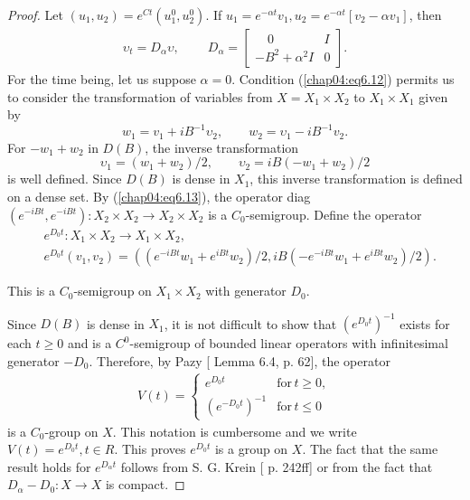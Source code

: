 \documentclass{surv-l}
\theoremstyle{plain}
\theoremstyle{definition}
\numberwithin{equation}{section}
\numberwithin{figure}{chapter}
\begin{document}
\begin{proof}
Let $(u_{1}, u_{2})=e^{Ct}(u_{1}^{0}, u_{2}^{0})$. If $u_{1}=e^{-\alpha t}v_{1}, u_{2}=e^{-\alpha t}[v_{2}-\alpha v_{1}]$, then
\begin{align}\label{chap04:eq6.14}
\upsilon_{t}=D_{\alpha}\upsilon,\ \qquad D_{\alpha}=\left[\begin{array}{cc}
\quad 0 & I\\
-B^{2}+\alpha^{2}I & 0
\end{array}\right].
\end{align}
For the time being, let us suppose $\alpha=0$. Condition (\ref{chap04:eq6.12}) permits us to consider the transformation of variables from $X=X_{1}\times X_{2}$ to $X_{1}\times X_{1}$ given by
\begin{equation*}
w_{1}=v_{1}+iB^{-1}\upsilon_{2},\qquad w_{2}=\upsilon_{1}-iB^{-1}v_{2}.
\end{equation*}
For $-w_{1}+w_{2}$ in $D(B)$, the inverse transformation
\begin{equation*}
\upsilon_{1}=(w_{1}+w_{2})/2,\qquad \upsilon_{2}=iB(-w_{1}+w_{2})/2
\end{equation*}
is well defined. Since $D(B)$ is dense in $X_{1}$, this inverse transformation is defined on a dense set. By (\ref{chap04:eq6.13}), the operator diag$(e^{-iBt},e^{-iBt})\!:X_{2}\times X_{2}\rightarrow X_{2}\times X_{2}$ is a $C_{0}$-semigroup. Define the operator
\begin{equation}
\begin{split}\label{chap04:eq6.15}
&e^{D_{0}t}:X_{1}\times X_{2}\rightarrow X_{1}\times X_{2},\\
&e^{D_{0}t}(v_{1}, v_{2})=((e^{-iBt}w_{1}+e^{iBt}w_{2})/2, iB(-e^{-iBt}w_{1}+e^{iBt}w_{2})/2).
\end{split}
\end{equation}

This is a $C_{0}$-semigroup on $X_{1}\times X_{2}$ with generator $D_{0}$.

Since $D(B)$ is dense in $X_{1}$, it is not difficult to show that $(e^{D_{0}t})^{-1}$ exists for each $t\geq 0$ and is a $C^{0}$-semigroup of bounded linear operators with infinitesimal generator $-D_{0}$. Therefore, by Pazy [\citeyear{1983p} Lemma 6.4, p. 62], the operator
\begin{align*}
V(t)=\left\{\begin{array}{ll}
e^{D_{0}t} & \mathrm{for} \,t\geq 0,\\
(e^{-D_{0}t})^{-1} & \mathrm{for} \,t\leq 0
\end{array}\right.
\end{align*}
is a $C_{0}$-group on $X$. This notation is cumbersome and we write $V(t)=e^{D_{0}t}, t\in R$. This proves $e^{D_{0}t}$ is a group on $X$. The fact that the same result holds for $e^{D_{\alpha}t}$ follows from S. G. Krein [\citeyear{1971k} p. 242ff] or from the fact that $D_{\alpha}-D_{0}\!:X\rightarrow X$ is compact.


\end{proof}
\end{document}
